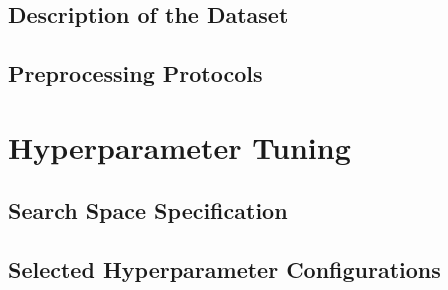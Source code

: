 \documentclass[a4paper,12pt]{article}
\theoremstyle{definition}
\begin{document}
\subsection{Description of the Dataset} \label{a:data_desc}



\subsection{Preprocessing Protocols} \label{a:data_prep_rule}



\section{Hyperparameter Tuning} \label{a:hyper_tune}

\subsection{Search Space Specification} \label{a:hyper_space}



\subsection{Selected Hyperparameter Configurations} \label{a:hyper_select}



\end{document}
